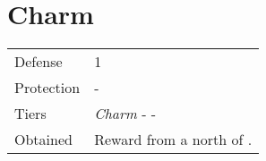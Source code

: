 \section{Charm}
\label{armor:charm}


\noindent\begin{tabularx}{\textwidth}[l]{lX}
	Defense
	& 1
\\
	Protection
	& -
\\
	Tiers
	& \textit{Charm} - \nameref{armor:magic_ring} - \nameref{armor:cupid_locket}
\\
	Obtained
	& Reward from a \nameref{map:battlefield_02} north of \nameref{map:level_forest}.
\end{tabularx}
